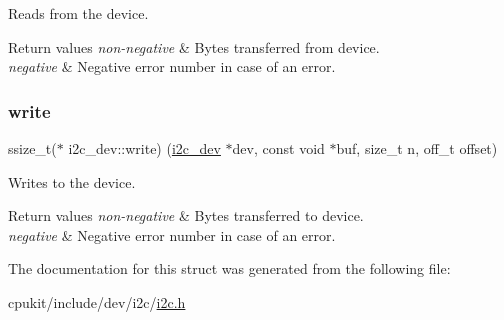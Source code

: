 Reads from the device. 


\begin{DoxyRetVals}{Return values}
{\em non-\/negative} & Bytes transferred from device. \\
\hline
{\em negative} & Negative error number in case of an error. \\
\hline
\end{DoxyRetVals}
\mbox{\label{structi2c__dev_acfbdecd732f6d4d458c8755c1e0f158d}} 
\subsubsection{\texorpdfstring{write}{write}}
{\footnotesize\ttfamily ssize\+\_\+t($\ast$ i2c\+\_\+dev\+::write) (\mbox{\hyperlink{structi2c__dev}{i2c\+\_\+dev}} $\ast$dev, const void $\ast$buf, size\+\_\+t n, off\+\_\+t offset)}



Writes to the device. 


\begin{DoxyRetVals}{Return values}
{\em non-\/negative} & Bytes transferred to device. \\
\hline
{\em negative} & Negative error number in case of an error. \\
\hline
\end{DoxyRetVals}


The documentation for this struct was generated from the following file\+:\begin{DoxyCompactItemize}
\item 
cpukit/include/dev/i2c/\mbox{\hyperlink{cpukit_2include_2dev_2i2c_2i2c_8h}{i2c.\+h}}\end{DoxyCompactItemize}
